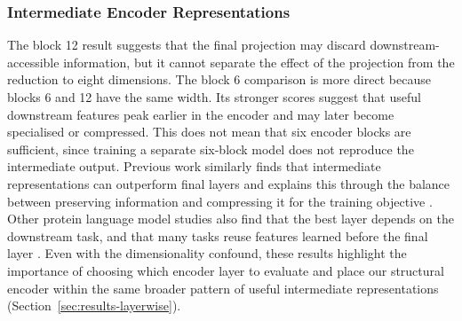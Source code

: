 \subsubsection{Intermediate Encoder Representations}

The block 12 result suggests that the final projection may discard downstream-accessible information, but it cannot separate the effect of the projection from the reduction to eight dimensions. The block 6 comparison is more direct because blocks 6 and 12 have the same width. Its stronger scores suggest that useful downstream features peak earlier in the encoder and may later become specialised or compressed. This does not mean that six encoder blocks are sufficient, since training a separate six-block model does not reproduce the intermediate output. Previous work similarly finds that intermediate representations can outperform final layers and explains this through the balance between preserving information and compressing it for the training objective \citep{skean2025layer}. Other protein language model studies also find that the best layer depends on the downstream task, and that many tasks reuse features learned before the final layer \citep{li2024featurereuse,joeres2026taskdataset}. Even with the dimensionality confound, these results highlight the importance of choosing which encoder layer to evaluate and place our structural encoder within the same broader pattern of useful intermediate representations (Section~\ref{sec:results-layerwise}).

\clearpage

\clearpage
\endinput
\appendix
